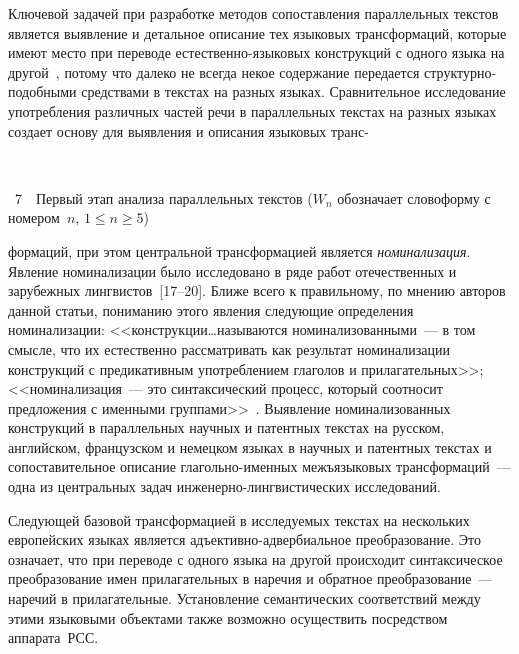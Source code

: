 \begin{multicols}{2}
     
     Ключевой задачей при разработке методов сопоставления 
параллельных текстов является выявление и детальное описание тех 
языковых трансформаций, которые имеют место при переводе 
     естест\-вен\-но-язы\-ко\-вых конструкций с одного языка на 
другой~\cite{9koz}, потому что далеко не всегда некое содержание 
передается струк\-тур\-но-по\-доб\-ны\-ми средствами в текстах на разных 
языках. Сравнительное исследование употребления различных частей речи в 
параллельных текстах на разных языках создает основу для выявления и 
описания языковых транс-\linebreak

\begin{center} %
\vspace*{3pt}
\mbox{%
\epsfxsize=79.726mm
}
\end{center}
\vspace*{4pt}
{{\figurename~7}\ \ \small{Первый этап анализа параллельных текстов ($W_n$
обозначает словоформу с номером~$n$, $1\leq n\geq 5$)}}

\addtocounter{figure}{1}
      

\noindent 
формаций, при этом центральной трансформацией
является \textit{номинализация}. Явление номинализации
было исследовано в 
ряде работ отечественных и зарубежных лингвистов~[17--20]. 
Ближе всего к правильному, по мнению авторов данной статьи, 
пониманию этого явления следующие определения номинализации: 
<<конструкции\ldots называются номинализованными~--- в том смысле, что 
их естественно рассматривать как результат номинализации конструкций с 
предикативным употреблением глаголов и прилагательных>>; 
<<номинализация~--- это синтаксический процесс, который соотносит 
предложения с именными группами>>~\cite{9koz, 10koz}. Выявление 
номинализованных конструкций в параллельных научных и патентных 
текстах на русском, английском, французском и немецком языках в научных 
и патентных текстах и сопоставительное описание гла\-голь\-но-имен\-ных 
межъязыковых трансформаций~--- одна из центральных задач 
     ин\-же\-нер\-но-линг\-ви\-сти\-че\-ских исследований. 
     
     Следующей базовой трансформацией в исследуемых текстах на 
нескольких европейских языках является адъек\-тив\-но-ад\-вер\-би\-аль\-ное 
преобразование. Это означает, что при переводе с одного языка на другой 
происходит синтаксическое преобразование имен прилагательных в наречия 
и обратное преобразование~--- наречий в прилагательные. Установление 
семантических соответствий между этими языковыми объектами также 
возможно осуществить посредством аппарата~РСС. 
     

\end{multicols}
